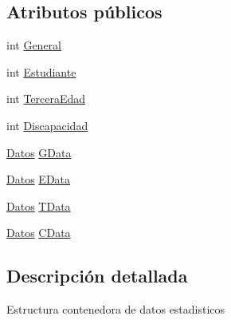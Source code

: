 \subsection*{Atributos públicos}
\begin{DoxyCompactItemize}
\item 
int \hyperlink{struct_proyecto___integrador__3_1_1_reportes_1_1_reporte_frecuencia_de_uso_1_1_estadistica_result_adcdb8058d2defe7733c72f4208d8ac50}{General}
\item 
int \hyperlink{struct_proyecto___integrador__3_1_1_reportes_1_1_reporte_frecuencia_de_uso_1_1_estadistica_result_a5e294c376eacca0ef132c57203b06e2d}{Estudiante}
\item 
int \hyperlink{struct_proyecto___integrador__3_1_1_reportes_1_1_reporte_frecuencia_de_uso_1_1_estadistica_result_a1f03891dfd3acad9574d7336569a1163}{Tercera\-Edad}
\item 
int \hyperlink{struct_proyecto___integrador__3_1_1_reportes_1_1_reporte_frecuencia_de_uso_1_1_estadistica_result_abf68ebf05212e2b1a27ce3f2f88013bc}{Discapacidad}
\item 
\hyperlink{struct_proyecto___integrador__3_1_1_reportes_1_1_reporte_frecuencia_de_uso_1_1_estadistica_result_1_1_datos}{Datos} \hyperlink{struct_proyecto___integrador__3_1_1_reportes_1_1_reporte_frecuencia_de_uso_1_1_estadistica_result_ad1a7bfc81616b1f8b97e1bc8f4af8eae}{G\-Data}
\item 
\hyperlink{struct_proyecto___integrador__3_1_1_reportes_1_1_reporte_frecuencia_de_uso_1_1_estadistica_result_1_1_datos}{Datos} \hyperlink{struct_proyecto___integrador__3_1_1_reportes_1_1_reporte_frecuencia_de_uso_1_1_estadistica_result_a658dfafbad0962130a3ee73c8b5f1c4b}{E\-Data}
\item 
\hyperlink{struct_proyecto___integrador__3_1_1_reportes_1_1_reporte_frecuencia_de_uso_1_1_estadistica_result_1_1_datos}{Datos} \hyperlink{struct_proyecto___integrador__3_1_1_reportes_1_1_reporte_frecuencia_de_uso_1_1_estadistica_result_ad182093453a1c4839364affc65f7dbc7}{T\-Data}
\item 
\hyperlink{struct_proyecto___integrador__3_1_1_reportes_1_1_reporte_frecuencia_de_uso_1_1_estadistica_result_1_1_datos}{Datos} \hyperlink{struct_proyecto___integrador__3_1_1_reportes_1_1_reporte_frecuencia_de_uso_1_1_estadistica_result_a9b9b8ca81a7fba4d0fd976c666cf20c5}{C\-Data}
\end{DoxyCompactItemize}


\subsection{Descripción detallada}
Estructura contenedora de datos estadisticos 



